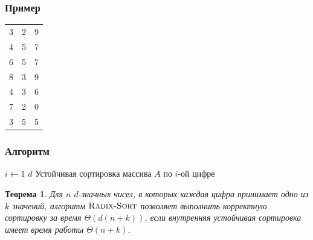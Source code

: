 \documentclass[hyperref={unicode=true}]{beamer}
\newtheorem{rtheorem}{Теорема}
\begin{document}
{
  \frametitle{Пример}
  \begin{tabular}{|c@{}c@{}c|}
    \hline
    3 & 2 & 9 \\
    4 & 5 & 7 \\
    6 & 5 & 7 \\
    8 & 3 & 9 \\
    4 & 3 & 6 \\
    7 & 2 & 0 \\
    3 & 5 & 5 \\
    \hline
  \end{tabular}
}
\frame
{
  \frametitle{Алгоритм}
  \begin{codebox}
      \li \For $i \gets 1$ \To $d$
      \li \Do Устойчивая сортировка массива $A$ по $i$-ой цифре
  \end{codebox}
  \begin{rtheorem}
    Для $n$ $d$-значных чисел, в которых каждая цифра принимает одно
    из $k$ значений, алгоритм $\textnormal{\scshape Radix-Sort}$ позволяет выполнить
    корректную сортировку за время $\Theta(d(n+k))$, если внутренняя
    устойчивая сортировка имеет время работы $\Theta(n+k)$.
  \end{rtheorem}
}
\end{document}
